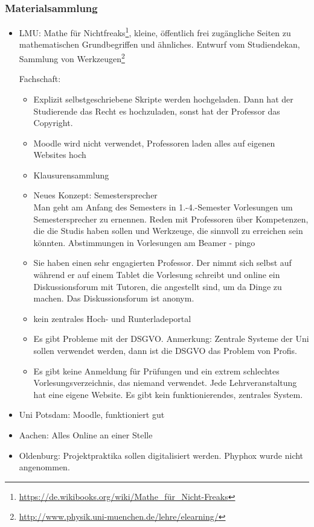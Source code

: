 \subsubsection*{Materialsammlung}
	\begin{itemize}
		\item LMU: Mathe für Nichtfreaks\footnote{\url{https://de.wikibooks.org/wiki/Mathe_für_Nicht-Freaks}}, kleine, öffentlich frei zugängliche Seiten zu mathematischen Grundbegriffen und ähnliches.
			Entwurf vom Studiendekan, Sammlung von Werkzeugen\footnote{\url{http://www.physik.uni-muenchen.de/lehre/elearning/}}

			Fachschaft:
			\begin{itemize}
				\item Explizit selbstgeschriebene Skripte werden hochgeladen. Dann hat der Studierende das Recht es hochzuladen, sonst hat der Professor das Copyright.\\

				\item Moodle wird nicht verwendet, Professoren laden alles auf eigenen Websites hoch
				\item Klausurensammlung

				\item Neues Konzept:
				Semestersprecher \\
				Man geht am Anfang des Semesters in 1.-4.-Semester Vorlesungen um Semestersprecher zu ernennen.
				Reden mit Professoren über Kompetenzen, die die Studis haben sollen und Werkzeuge, die sinnvoll zu erreichen sein könnten.
				Abstimmungen in Vorlesungen am Beamer - pingo

				\item Sie haben einen sehr engagierten Professor.
				Der nimmt sich selbst auf während er auf einem Tablet die Vorlesung schreibt
				und online ein Diskussionsforum mit Tutoren, die angestellt sind, um da Dinge zu machen.
				Das Diskussionsforum ist anonym.

				\item kein zentrales Hoch- und Runterladeportal

				\item Es gibt Probleme mit der DSGVO.
				Anmerkung: Zentrale Systeme der Uni sollen verwendet werden, dann ist die DSGVO das Problem von Profis.

				\item Es gibt keine Anmeldung für Prüfungen und ein extrem schlechtes Vorlesungsverzeichnis, das niemand verwendet.
				Jede Lehrveranstaltung hat eine eigene Website. Es gibt kein funktionierendes, zentrales System.
			\end{itemize}
			\item Uni Potsdam: Moodle, funktioniert gut
			\item Aachen: Alles Online an einer Stelle
			\item Oldenburg: Projektpraktika sollen digitalisiert werden. Phyphox wurde nicht angenommen.
	\end{itemize}

